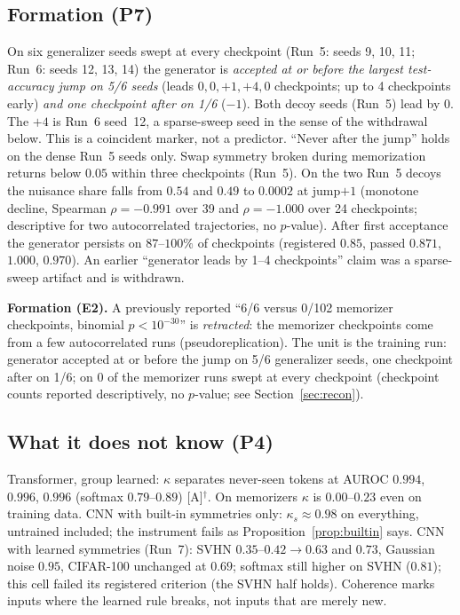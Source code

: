 \documentclass[11pt]{article}
\newcommand{\lev}[1]{\textsc{[#1]}}%
\begin{document}
\subsection{Formation (P7)}\label{sec:p7}
On six generalizer seeds swept at every checkpoint (Run~5: seeds 9, 10, 11; Run~6: seeds 12, 13, 14) the generator is \emph{accepted at or before the largest test-accuracy jump on 5/6 seeds} (leads $0,0,+1,+4,0$ checkpoints; up to 4 checkpoints early) \emph{and one checkpoint after on 1/6} ($-1$). Both decoy seeds (Run~5) lead by 0. The $+4$ is Run~6 seed~12, a sparse-sweep seed in the sense of the withdrawal below. This is a coincident marker, not a predictor. ``Never after the jump'' holds on the dense Run~5 seeds only. Swap symmetry broken during memorization returns below $0.05$ within three checkpoints (Run~5). On the two Run~5 decoys the nuisance share falls from $0.54$ and $0.49$ to $0.0002$ at jump$+1$ (monotone decline, Spearman $\rho=-0.991$ over 39 and $\rho=-1.000$ over 24 checkpoints; descriptive for two autocorrelated trajectories, no $p$-value). After first acceptance the generator persists on $87$--$100\%$ of checkpoints (registered $0.85$, passed $0.871$, $1.000$, $0.970$). An earlier ``generator leads by 1--4 checkpoints'' claim was a sparse-sweep artifact and is withdrawn.

\textbf{Formation (E2).} A previously reported ``6/6 versus 0/102 memorizer checkpoints, binomial $p<10^{-30}$'' is \emph{retracted}: the memorizer checkpoints come from a few autocorrelated runs (pseudoreplication). The unit is the training run: generator accepted at or before the jump on 5/6 generalizer seeds, one checkpoint after on 1/6; on 0 of the memorizer runs swept at every checkpoint (checkpoint counts reported descriptively, no $p$-value; see Section~\ref{sec:recon}).

\subsection{What it does not know (P4)}
Transformer, group learned: $\kappa$ separates never-seen tokens at AUROC $0.994$, $0.996$, $0.996$ (softmax $0.79$--$0.89$) \lev{A}$^\dagger$. On memorizers $\kappa$ is $0.00$--$0.23$ even on training data. CNN with built-in symmetries only: $\kappa_s\approx0.98$ on everything, untrained included; the instrument fails as Proposition~\ref{prop:builtin} says. CNN with learned symmetries (Run~7): SVHN $0.35$--$0.42\to0.63$ and $0.73$, Gaussian noise $0.95$, CIFAR-100 unchanged at $0.69$; softmax still higher on SVHN ($0.81$); this cell failed its registered criterion (the SVHN half holds). Coherence marks inputs where the learned rule breaks, not inputs that are merely new.
\end{document}
